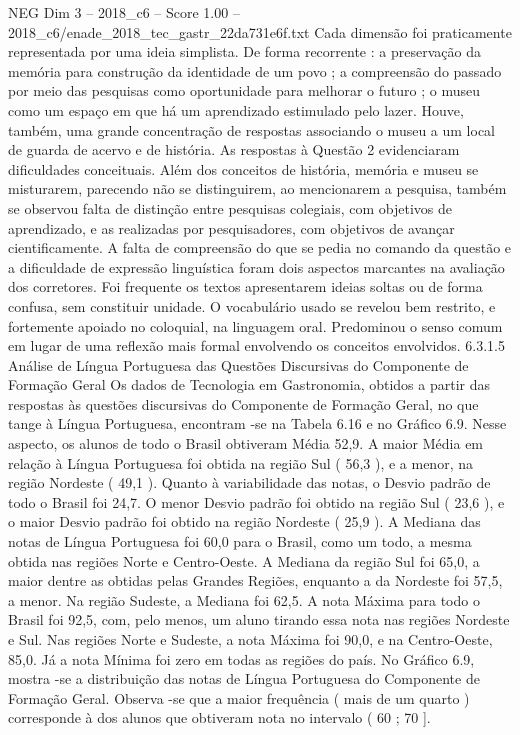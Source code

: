 \begin{textsample}{NEG Dim 3 – 2018\_c6 – Score 1.00 – 2018\_c6/enade\_2018\_tec\_gastr\_22da731e6f.txt}
Cada dimensão foi praticamente representada por uma ideia simplista.
De forma recorrente : a preservação da memória para construção da identidade de um povo ; a compreensão do passado por meio das pesquisas como oportunidade para melhorar o futuro ; o museu como um espaço em que há um aprendizado estimulado pelo lazer.
Houve, também, uma grande concentração de respostas associando o museu a um local de guarda de acervo e de história.
As respostas à Questão 2 evidenciaram dificuldades conceituais.
Além dos conceitos de história, memória e museu se misturarem, parecendo não se distinguirem, ao mencionarem a pesquisa, também se observou falta de distinção entre pesquisas colegiais, com objetivos de aprendizado, e as realizadas por pesquisadores, com objetivos de avançar cientificamente.
A falta de compreensão do que se pedia no comando da questão e a dificuldade de expressão linguística foram dois aspectos marcantes na avaliação dos corretores.
Foi frequente os textos apresentarem ideias soltas ou de forma confusa, sem constituir unidade.
O vocabulário usado se revelou bem restrito, e fortemente apoiado no coloquial, na linguagem oral.
Predominou o senso comum em lugar de uma reflexão mais formal envolvendo os conceitos envolvidos. 6.3.1.5 Análise de Língua Portuguesa das Questões Discursivas do Componente de Formação Geral Os dados de Tecnologia em Gastronomia, obtidos a partir das respostas às questões discursivas do Componente de Formação Geral, no que tange à Língua Portuguesa, encontram -se na Tabela 6.16 e no Gráfico 6.9.
Nesse aspecto, os alunos de todo o Brasil obtiveram Média 52,9.
A maior Média em relação à Língua Portuguesa foi obtida na região Sul ( 56,3 ), e a menor, na região Nordeste ( 49,1 ).
Quanto à variabilidade das notas, o Desvio padrão de todo o Brasil foi 24,7.
O menor Desvio padrão foi obtido na região Sul ( 23,6 ), e o maior Desvio padrão foi obtido na região Nordeste ( 25,9 ).
A Mediana das notas de Língua Portuguesa foi 60,0 para o Brasil, como um todo, a mesma obtida nas regiões Norte e Centro-Oeste.
A Mediana da região Sul foi 65,0, a maior dentre as obtidas pelas Grandes Regiões, enquanto a da Nordeste foi 57,5, a menor.
Na região Sudeste, a Mediana foi 62,5.
A nota Máxima para todo o Brasil foi 92,5, com, pelo menos, um aluno tirando essa nota nas regiões Nordeste e Sul.
Nas regiões Norte e Sudeste, a nota Máxima foi 90,0, e na Centro-Oeste, 85,0.
Já a nota Mínima foi zero em todas as regiões do país.
No Gráfico 6.9, mostra -se a distribuição das notas de Língua Portuguesa do Componente de Formação Geral.
Observa -se que a maior frequência ( mais de um quarto ) corresponde à dos alunos que obtiveram nota no intervalo ( 60 ; 70 ].

\end{textsample}
